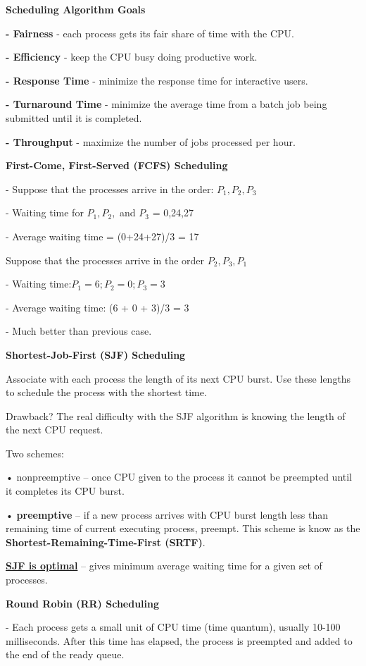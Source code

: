 \documentclass[]{report}
\begin{document}
\textbf{Scheduling Algorithm Goals}

\textbf{- Fairness} - each process gets its fair share of time
with the CPU.

\textbf{- Efficiency} - keep the CPU busy doing productive
work.

\textbf{- Response Time} - minimize the response time for
interactive users.

\textbf{- Turnaround Time} - minimize the average time
from a batch job being submitted until it is
completed.

\textbf{- Throughput} - maximize the number of jobs
processed per hour.

\textbf{First-Come, First-Served (FCFS) Scheduling}

- Suppose that the processes arrive in the order: $P_1 , P_2 , P_3$

- Waiting time for $P_1 , P_2 ,$ and $P_3$ = 0,24,27

- Average waiting time = (0+24+27)/3 = 17

Suppose that the processes arrive in the order $P_2, P_3, P_1$

- Waiting time:$P_1 = 6; P_2 = 0; P_3 = 3$

- Average waiting time: (6 + 0 + 3)/3 = 3

- Much better than previous case.

\textbf{Shortest-Job-First (SJF) Scheduling}

Associate with each process the length of its next
CPU burst. Use these lengths to schedule the
process with the shortest time.

Drawback?
The real difficulty with the SJF algorithm is knowing
the length of the next CPU request.

Two schemes:

• nonpreemptive – once CPU given to the process it
cannot be preempted until it completes its CPU
burst.

• \textbf{preemptive} – if a new process arrives with CPU
burst length less than remaining time of current
executing process, preempt. This scheme is know
as the \textbf{Shortest-Remaining-Time-First (SRTF)}.

\textbf{\underline{SJF is optimal}} – gives minimum average waiting
time for a given set of processes.

\textbf{Round Robin (RR) Scheduling}

- Each process gets a small unit of CPU time (time
quantum), usually 10-100 milliseconds. After this
time has elapsed, the process is preempted and added
to the end of the ready queue.
\end{document}
